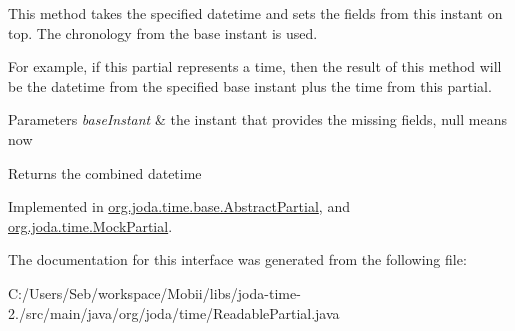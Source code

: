 This method takes the specified datetime and sets the fields from this instant on top. The chronology from the base instant is used. 

For example, if this partial represents a time, then the result of this method will be the datetime from the specified base instant plus the time from this partial.


\begin{DoxyParams}{Parameters}
{\em base\-Instant} & the instant that provides the missing fields, null means now \\
\hline
\end{DoxyParams}
\begin{DoxyReturn}{Returns}
the combined datetime 
\end{DoxyReturn}


Implemented in \hyperlink{classorg_1_1joda_1_1time_1_1base_1_1_abstract_partial_ac09df7e71445efc808eb25238d6b9452}{org.\-joda.\-time.\-base.\-Abstract\-Partial}, and \hyperlink{classorg_1_1joda_1_1time_1_1_mock_partial_a0f59e6f8002a6a6914dc08d640132c47}{org.\-joda.\-time.\-Mock\-Partial}.



The documentation for this interface was generated from the following file\-:\begin{DoxyCompactItemize}
\item 
C\-:/\-Users/\-Seb/workspace/\-Mobii/libs/joda-\/time-\/2./src/main/java/org/joda/time/Readable\-Partial.\-java\end{DoxyCompactItemize}
